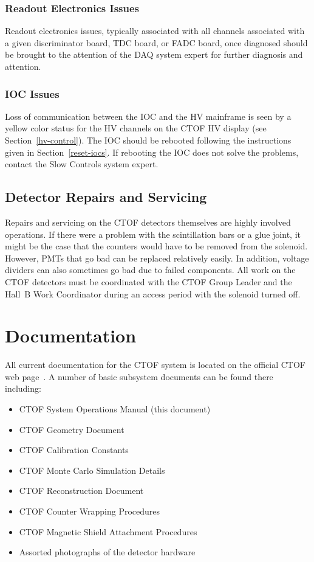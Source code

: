 \documentclass[12pt]{article}
\begin{document}
\subsubsection{Readout Electronics Issues}
\label{readout-issues}

Readout electronics issues, typically associated with all channels associated with a given
discriminator board, TDC board, or FADC board, once diagnosed should be brought to the
attention of the DAQ system expert for further diagnosis and attention.

\subsubsection{IOC Issues}
\label{ioc-issues}

Loss of communication between the IOC and the HV mainframe is seen by a yellow color status for
the HV channels on the CTOF HV display (see Section~\ref{hv-control}). The IOC should be rebooted 
following the instructions given in Section~\ref{reset-iocs}. If rebooting the IOC does not solve 
the problems, contact the Slow Controls system expert.

\subsection{Detector Repairs and Servicing}

Repairs and servicing on the CTOF detectors themselves are highly involved operations. If there 
were a problem with the scintillation bars or a glue joint, it might be the case that the 
counters would have to be removed from the solenoid. However, PMTs that go bad can be replaced 
relatively easily. In addition, voltage dividers can also sometimes go bad due to failed 
components. All work on the CTOF detectors must be coordinated with the CTOF Group Leader and 
the Hall~B Work Coordinator during an access period with the solenoid turned off.

\clearpage

\vfil
\eject

\section{Documentation}

All current documentation for the CTOF system is located on the official CTOF web page~\cite{ctof-web}. 
A number of basic subsystem documents can be found there including:

\begin{itemize}
\item CTOF System Operations Manual (this document)
\item CTOF Geometry Document
\item CTOF Calibration Constants
\item CTOF Monte Carlo Simulation Details
\item CTOF Reconstruction Document
\item CTOF Counter Wrapping Procedures
\item CTOF Magnetic Shield Attachment Procedures
\item Assorted photographs of the detector hardware
\end{itemize}
\end{document}
